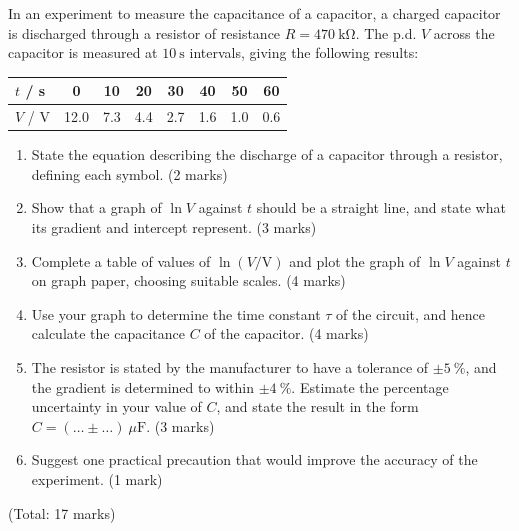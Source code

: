 \documentclass[11pt]{article}
\begin{document}
\begin{exercice}
In an experiment to measure the capacitance of a capacitor, a charged capacitor is discharged through a resistor of resistance $R = 470\ \mathrm{k\Omega}$. The p.d. $V$ across the capacitor is measured at $10\ \mathrm{s}$ intervals, giving the following results:
\begin{center}
\begin{tabular}{|l|c|c|c|c|c|c|c|}
\hline
\rowcolor{popblueL} $t$ / s & 0 & 10 & 20 & 30 & 40 & 50 & 60 \\
\hline $V$ / V & 12.0 & 7.3 & 4.4 & 2.7 & 1.6 & 1.0 & 0.6 \\
\hline
\end{tabular}
\end{center}
\begin{enumerate}
\item State the equation describing the discharge of a capacitor through a resistor, defining each symbol. \hfill (2 marks)
\item Show that a graph of $\ln V$ against $t$ should be a straight line, and state what its gradient and intercept represent. \hfill (3 marks)
\item Complete a table of values of $\ln(V/\mathrm{V})$ and plot the graph of $\ln V$ against $t$ on graph paper, choosing suitable scales. \hfill (4 marks)
\item Use your graph to determine the time constant $\tau$ of the circuit, and hence calculate the capacitance $C$ of the capacitor. \hfill (4 marks)
\item The resistor is stated by the manufacturer to have a tolerance of $\pm 5\ \%$, and the gradient is determined to within $\pm 4\ \%$. Estimate the percentage uncertainty in your value of $C$, and state the result in the form $C = (\ldots \pm \ldots)\ \mu\mathrm{F}$. \hfill (3 marks)
\item Suggest one practical precaution that would improve the accuracy of the experiment. \hfill (1 mark)
\end{enumerate}
\hfill (Total: 17 marks)
\end{exercice}
\end{document}

